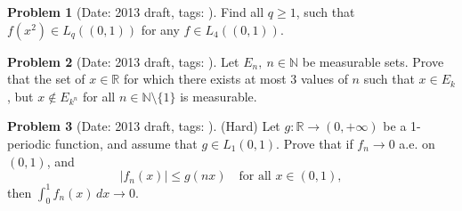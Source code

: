 \documentclass[11pt, notitlepage]{article}
\theoremstyle{definition}
\theoremstyle{definition}
\theoremstyle{definition}
\newtheorem{probstate}{Problem}
\theoremstyle{remark}
\newenvironment{problem}[2]{
    \begin{probstate}[Date: #1, tags: \texttt{#2}]
}
{
  \end{probstate}
}
\newcommand{\R}{\mathbb{R}}
\newcommand{\N}{\mathbb{N}}
\begin{document}
\begin{problem}{2013 draft}{}
Find all $q \ge 1$, such that $f(x^2) \in L_q((0,1))$ for any $f  \in L_4((0,1))$.
\end{problem}

\begin{problem}{2013 draft}{}
Let $E_n, \ n \in \N$ be measurable sets. Prove that the set of $x \in \R$ for which there exists at most 3 values of $n$ such that $x \in E_k$, but $x \notin E_{k^n}$ for all $n \in \N \setminus \{1\}$ is measurable.
\end{problem}

\begin{problem}{2013 draft}{}
(Hard) Let $g: \R \to (0,+\infty)$ be a 1-periodic function, and assume that $g \in L_1(0,1)$. Prove that if $f_n \to 0$ a.e. on $(0,1)$, and
    \[
     |f_n(x)| \le g(nx) \quad \text{for all } x \in (0,1),
    \]
    then $\int_0^1f_n (x) \, dx \to 0$.
\end{problem}
\end{document}
